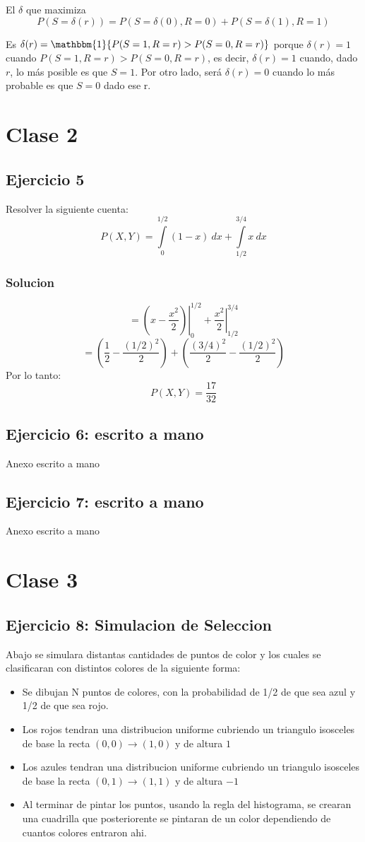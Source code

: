 \documentclass[12pt, a4paper]{article}
\begin{document}
El $\delta$ que maximiza $$P(S = \delta(r))=P(S= \delta(0),R=0) + P(S= \delta(1),R=1)$$

Es $\delta(r)= \mathbbm{1}\{P(S=1,R=r)>P(S=0,R=r)\}$ porque $\delta(r)=1$ cuando $P(S=1,R=r)>P(S=0,R=r)$, es decir, $\delta(r)=1$ cuando, dado $r$, lo más posible es que $S=1$. Por otro lado, será $\delta(r)=0$ cuando lo más probable es que $S=0$ dado ese r.

\section{Clase 2}
\subsection{Ejercicio 5}
Resolver la siguiente cuenta:
		$$P(X,Y) = \int\limits_0^{1/2}(1-x)\ dx + \int\limits_{1/2}^{3/4} x\ dx$$
\subsubsection{Solucion}
		$$= \left.\left(x-\frac{x^2}{2}\right)\right|_{0}^{1/2}+\left. \frac{x^2}{2}\right|_{1/2}^{3/4}$$
		$$= \left(\frac{1}{2}-\frac{(1/2)^2}{2}\right) + \left(\frac{(3/4)^2}{2} - \frac{(1/2)^2}{2}\right)$$
Por lo tanto:
		$$P(X,Y) = \frac{17}{32}$$
\subsection{Ejercicio 6: escrito a mano}
Anexo escrito a mano
\subsection{Ejercicio 7: escrito a mano}
Anexo escrito a mano
\section{Clase 3}
\subsection{Ejercicio 8: Simulacion de Seleccion}

Abajo se simulara distantas cantidades de puntos de color y los cuales se clasificaran con distintos colores de la siguiente forma:
\begin{itemize}
	\item Se dibujan N puntos de colores, con la probabilidad de 1/2 de que sea azul y 1/2 de que sea rojo.
	\item Los rojos tendran una distribucion uniforme cubriendo un triangulo isosceles de base la recta $(0,0)\rightarrow(1,0)$ y de altura $1$
	\item Los azules tendran una distribucion uniforme cubriendo un triangulo isosceles de base la recta $(0,1)\rightarrow(1,1)$ y de altura $-1$
	\item Al terminar de pintar los puntos, usando la regla del histograma, se crearan una cuadrilla que posteriorente se pintaran de un color dependiendo de cuantos colores entraron ahi.
\end{itemize}
\end{document}
